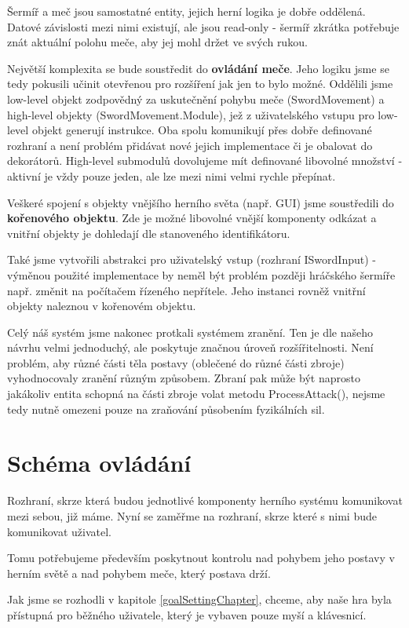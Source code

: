 Šermíř a meč jsou samostatné entity, jejich herní logika je dobře oddělená. Datové závislosti mezi nimi existují, ale jsou read-only - šermíř zkrátka potřebuje znát aktuální polohu meče, aby jej mohl držet ve svých rukou.

Největší komplexita se bude soustředit do \textbf{ovládání meče}. Jeho logiku jsme se tedy pokusili učinit otevřenou pro rozšíření jak jen to bylo možné. Oddělili jsme low-level objekt zodpovědný za uskutečnění pohybu meče (SwordMovement) a high-level objekty (SwordMovement.Module), jež z uživatelského vstupu pro low-level objekt generují instrukce. Oba spolu komunikují přes dobře definované rozhraní a není problém přidávat nové jejich implementace či je obalovat do dekorátorů. High-level submodulů dovolujeme mít definované libovolné množství - aktivní je vždy pouze jeden, ale lze mezi nimi velmi rychle přepínat. 

Veškeré spojení s objekty vnějšího herního světa (např. GUI) jsme soustředili do \textbf{kořenového objektu}. Zde je možné libovolné vnější komponenty odkázat a vnitřní objekty je dohledají dle stanoveného identifikátoru.

Také jsme vytvořili abstrakci pro uživatelský vstup (rozhraní ISwordInput) - výměnou použité implementace by neměl být problém později hráčského šermíře např. změnit na počítačem řízeného nepřítele. Jeho instanci rovněž vnitřní objekty naleznou v kořenovém objektu. 

Celý náš systém jsme nakonec protkali systémem zranění. Ten je dle našeho návrhu velmi jednoduchý, ale poskytuje značnou úroveň rozšířitelnosti. Není problém, aby různé části těla postavy (oblečené do různé části zbroje) vyhodnocovaly zranění různým způsobem. Zbraní pak může být naprosto jakákoliv entita schopná na části zbroje volat metodu ProcessAttack(), nejsme tedy nutně omezeni pouze na zraňování působením fyzikálních sil.

\section{Schéma ovládání} 

Rozhraní, skrze která budou jednotlivé komponenty herního systému komunikovat mezi sebou, již máme. Nyní se zaměřme na rozhraní, skrze které s nimi bude komunikovat uživatel.

Tomu potřebujeme především poskytnout kontrolu nad pohybem jeho postavy v herním světě a nad pohybem meče, který postava drží.

Jak jsme se rozhodli v kapitole \ref{goalSettingChapter}, chceme, aby naše hra byla přístupná pro běžného uživatele, který je vybaven pouze myší a klávesnicí.

